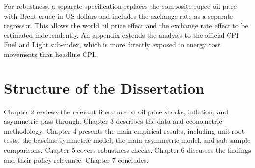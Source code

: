 For robustness, a separate specification replaces the composite rupee oil price with Brent crude in US dollars and includes the exchange rate as a separate regressor. This allows the world oil price effect and the exchange rate effect to be estimated independently. An appendix extends the analysis to the official CPI Fuel and Light sub-index, which is more directly exposed to energy cost movements than headline CPI.

\section{Structure of the Dissertation}

Chapter 2 reviews the relevant literature on oil price shocks, inflation, and asymmetric pass-through. Chapter 3 describes the data and econometric methodology. Chapter 4 presents the main empirical results, including unit root tests, the baseline symmetric model, the main asymmetric model, and sub-sample comparisons. Chapter 5 covers robustness checks. Chapter 6 discusses the findings and their policy relevance. Chapter 7 concludes.

